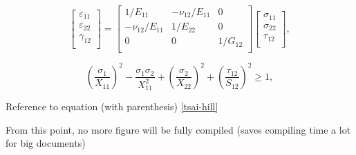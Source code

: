 \begin{equation}
\begin{bmatrix}
\varepsilon_{11} \\
\varepsilon_{22} \\
\gamma_{12} \\
\end{bmatrix}
=
\begin{bmatrix}
1/E_{11} & -\nu_{12}/E_{11} & 0 \\
-\nu_{12}/E_{11} & 1/E_{22} & 0 \\
0 & 0 & 1/G_{12} \\
\end{bmatrix}
\begin{bmatrix}
\sigma_{11} \\
\sigma_{22} \\
\tau_{12} \\
\end{bmatrix},
\end{equation}


\begin{equation}\label{tsai-hill}
    \left(\frac{\sigma_1}{X_{11}}\right)^2 - \frac{\sigma_1\sigma_2}{X_{11}^2} + \left(\frac{\sigma_2}{X_{22}}\right)^2 + \left(\frac{\tau_{12}}{S_{12}}\right)^2 \geq 1,
\end{equation}

Reference to equation (with parenthesis) \eqref{tsai-hill} 

From this point, no more figure will be fully compiled (saves compiling time a lot for big documents)


